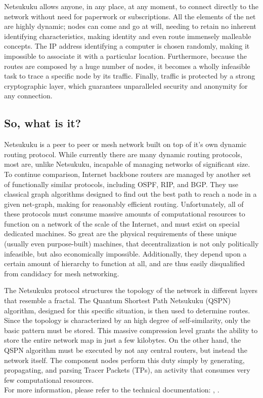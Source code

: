 \documentclass[a4paper]{article}
\begin{document}
Netsukuku allows anyone, in any place, at any moment, to connect directly to the network
without need for paperwork or subscriptions. 
All the elements of the net are highly dynamic; nodes can come and go at will, needing to
retain no inherent identifying characteristics, making identity and even route immensely
malleable concepts.  The IP address identifying a computer is chosen randomly, making it
impossible to associate it with a particular location.  Furthermore, because the routes 
are composed by a huge number of nodes, it becomes a wholly infeasible task to trace
a specific node by its traffic.  Finally, traffic is protected by a strong cryptographic
layer\cite{carciofo}, which guarantees unparalleled security and anonymity for any connection.

\subsection{So, what is it?}

Netsukuku is a peer to peer or mesh network built on top of it's own dynamic routing protocol.
While currently there are many dynamic routing protocols, most are, unlike Netsukuku, incapable
of managing networks of significant size.  To continue comparison, Internet backbone routers
are managed by another set of functionally similar protocols, including OSPF, RIP, and BGP.
They use classical graph algorithms designed to find out the best path to reach a node in a 
given net-graph, making for reasonably efficient routing.  Unfortunately, all of these 
protocols must consume massive amounts of computational resources to function on a network
of the scale of the Internet, and must exist on special dedicated machines. 
So great are the physical requirements of these unique (usually even purpose-built) machines,
that decentralization is not only politically infeasible, but also economically impossible.
Additionally, they depend upon a certain amount of hierarchy to function at all, and are
thus easily disqualified from candidacy for mesh networking.

The Netsukuku protocol structures the topology of the network in different
layers that resemble a fractal\cite{ntktopology}. The  
Quantum Shortest Path Netsukuku (QSPN)\cite{qspndoc} algorithm, designed for this
specific situation, is then used to determine routes. Since the topology is
characterized by an high degree of self-similarity, only the basic pattern must be stored.
This massive compression level grants the ability to store the entire network map in
just a few kilobytes. On the other hand, the QSPN algorithm must be executed by not
any central routers, but instead the network itself.  The component nodes perform this 
duty simply by generating, propagating, and parsing Tracer Packets (TPs), an activity 
that consumes very few computational resources.\\
For more information, please refer to the technical
documentation: \cite{ntktopology}, \cite{qspndoc}.
\end{document}
